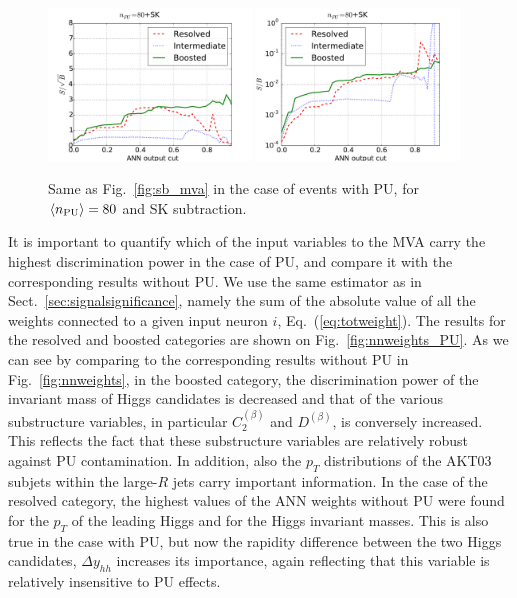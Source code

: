 \begin{figure}[t]
\begin{center}
\includegraphics[width=0.48\textwidth]{plots/ssb_SKPU80.pdf}
\includegraphics[width=0.48\textwidth]{plots/sb_SKPU80.pdf}
\caption{\small 
Same as Fig.~\ref{fig:sb_mva} in the
case of events with PU, for
 $\left\langle n_{\rm PU}\right\rangle=80$ 
  and SK subtraction.
}
\label{fig:sb_mva_PU}
\end{center}
\end{figure}

It is important to quantify which of the input variables
to the MVA carry the highest discrimination power
in the case of PU,
and compare it with the corresponding
results without PU.
%
We use the same estimator as in Sect.~\ref{sec:signalsignificance},
namely the sum
of the absolute value of all the weights connected to a given
input neuron $i$, Eq.~(\ref{eq:totweight}).
%
The results for the resolved and boosted categories are shown
on Fig.~\ref{fig:nnweights_PU}.
%
As we can see by comparing to the corresponding
results without PU in Fig.~\ref{fig:nnweights}, 
in the boosted category, the discrimination power of the invariant
mass of Higgs candidates is decreased and that of the various substructure
variables, in particular $C_2^{(\beta)}$ and
$D^{(\beta)}$, is conversely
increased.
%
This reflects the fact that these substructure variables are
relatively robust against PU contamination.
%
In addition, also the $p_T$ distributions of the AKT03
subjets within the large-$R$
jets carry important information.
%
In the case of the resolved category,  the highest
values of the ANN weights without PU
were found for the $p_T$ of the leading
Higgs and for the Higgs invariant masses.
%
This is also true in the case with PU, but now the rapidity difference
between the two Higgs candidates, $\Delta y_{hh}$ increases its
importance, again reflecting that this variable is relatively
insensitive to PU effects.
%

